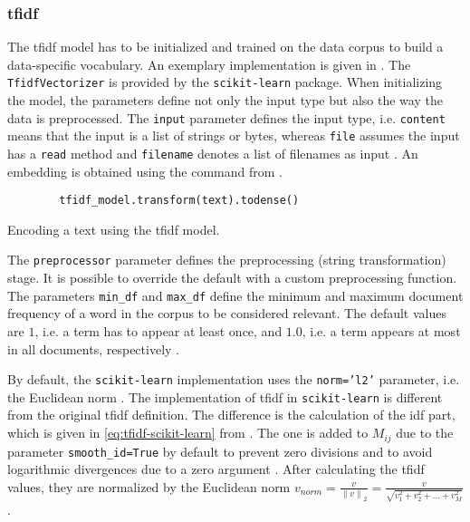 \subsubsection*{\ac{tfidf}}\label{subsubsec:impl-tfidf}

The \ac{tfidf} model has to be initialized and trained on the data corpus to build a data-specific vocabulary.
An exemplary implementation is given in .
The \texttt{TfidfVectorizer} is provided by the \texttt{scikit-learn} package.
When initializing the model, the parameters define not only the input type but also the way the data is preprocessed.
The \texttt{input} parameter defines the input type, i.e. \texttt{content} means that the input is a list of strings or bytes, 
whereas \texttt{file} assumes the input has a \texttt{read} method and \texttt{filename} denotes a list of filenames as input \cite{tfidf-scikit-learn}.
An embedding is obtained using the command from .

\begin{listing}[htp]
    \begin{verbatim}
        tfidf_model.transform(text).todense()
    \end{verbatim}
    \caption[Encoding a text using the \ac{tfidf} model]{Encoding a text using the \ac{tfidf} model.
    }
    \label{lst:encode-tfidf}
\end{listing}

The \texttt{preprocessor} parameter defines the preprocessing (string transformation) stage.
It is possible to override the default with a custom preprocessing function.
The parameters \texttt{min\_df} and \texttt{max\_df} define the minimum and maximum document frequency of a word in the corpus to be considered relevant.
The default values are $1$, i.e. a term has to appear at least once, and $1.0$, i.e. a term appears at most in all documents, respectively \cite{tfidf-scikit-learn}.

By default, the \texttt{scikit-learn} implementation uses the \texttt{norm='l2'} parameter, i.e. the Euclidean norm \cite{tfidf-scikit-learn}.
The implementation of \ac{tfidf} in \texttt{scikit-learn} is different from the original \ac{tfidf} definition.
The difference is the calculation of the \ac{idf} part, which is given in \autoref{eq:tfidf-scikit-learn} from \cite{tfidf-scikit-learn}.
The one is added to $M_{ij}$ due to the parameter \texttt{smooth\_id=True} by default to prevent zero divisions \cite{tfidf-scikit-learn}
and to avoid logarithmic divergences due to a zero argument \cite{glove2014}.
After calculating the \ac{tfidf} values, they are normalized by the Euclidean norm 
$v_{norm} = \frac{v}{\left\| v \right\|_{2}} = \frac{v}{\sqrt{v_1^{2} + v_2^{2} + ... + v_M^{2}}}$.


